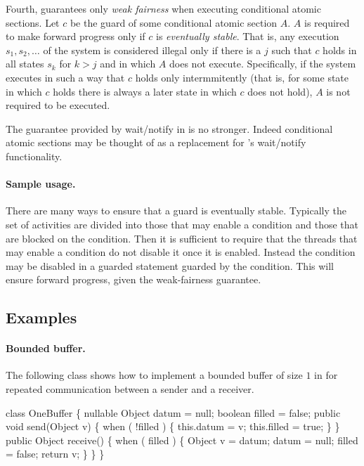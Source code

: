 {{Fourth, \Xten{} guarantees only {\em weak fairness} when executing
conditional atomic sections. Let $c$ be the guard of some conditional
atomic section $A$. $A$ is required to make forward progress only if
$c$ is {\em eventually stable}. That is, any execution $s_1, s_2,
\ldots$ of the system is considered illegal only if there is a $j$
such that $c$ holds in all states $s_k$ for $k > j$ and in which $A$
does not execute. Specifically, if the system executes in such a way
that $c$ holds only intermmitently (that is, for some state in which
$c$ holds there is always a later state in which $c$ does not hold),
$A$ is not required to be executed.

\begin{rationale}
The guarantee provided by {\cf wait/notify} in \java{} is no
stronger. Indeed conditional atomic sections may be thought of as a
replacement for \java's wait/notify functionality.
\end{rationale} 

\paragraph{Sample usage.} 
There are many ways to ensure that a guard is eventually
stable. Typically the set of activities are divided into those that
may enable a condition and those that are blocked on the
condition. Then it is sufficient to require that the threads that may
enable a condition do not disable it once it is enabled. Instead the
condition may be disabled in a guarded statement guarded by the
condition. This will ensure forward progress, given the weak-fairness
guarantee.

\subsection{Examples}

\paragraph{Bounded buffer.}
The following class shows how to implement a bounded buffer of size
$1$ in \Xten{} for repeated communication between a sender and a
receiver.

\begin{x10}
class OneBuffer \{
  nullable Object datum = null;
  boolean filled = false;
  public 
    void send(Object v) \{
      when ( !filled ) \{
        this.datum = v;
        this.filled = true;
    \}
 \}
  public
    Object receive() \{
      when ( filled ) \{
        Object v  = datum;
        datum = null;
        filled = false;
        return v;
      \}
  \}
\}
\end{x10}

}}

